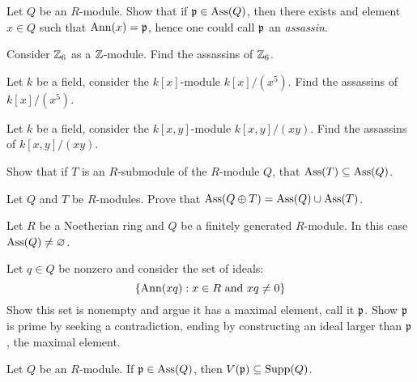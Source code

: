 \documentclass{ximera}
\begin{document}
\begin{exercise}
  Let $Q$ be an $R$-module. Show that if $\mathfrak{p}\in\operatorname{Ass}(Q)$, then there
  exists and element $x\in Q$ such that $\operatorname{Ann}(x) = \mathfrak{p}$, hence one
  could call $\mathfrak{p}$ an \textit{assassin}.
\end{exercise}

\begin{exercise}
  Consider $\mathbb Z_6$ as a $\mathbb Z$-module. Find the assassins of $\mathbb Z_6$.
\end{exercise}

\begin{exercise}
  Let $k$ be a field, consider the $k[x]$-module $k[x]/(x^5)$. Find
  the assassins of $k[x]/(x^5)$.
\end{exercise}

\begin{exercise}
  Let $k$ be a field, consider the $k[x,y]$-module $k[x,y]/(xy)$. Find
  the assassins of $k[x,y]/(xy)$.
\end{exercise}

\begin{exercise}
  Show that if $T$ is an $R$-submodule of the $R$-module $Q$, that
  $\operatorname{Ass}(T) \subseteq \operatorname{Ass}(Q)$.
\end{exercise}


\begin{exercise}
  Let $Q$ and $T$ be $R$-modules. Prove that $\operatorname{Ass}(Q\oplus T) = \operatorname{Ass}(Q)\cup\operatorname{Ass}(T)$.
\end{exercise}


\begin{proposition}
  Let $R$ be a Noetherian ring and $Q$ be a finitely generated
  $R$-module. In this case $\operatorname{Ass}(Q) \ne \varnothing$.
  \begin{sketch}
    Let $q\in Q$ be nonzero and consider the set of ideals:
    \[
    \{\operatorname{Ann}(xq): x\in R\text{ and }xq\ne 0 \}
    \]
    Show this set is nonempty and argue it has a maximal element, call
    it $\mathfrak{p}$. Show $\mathfrak{p}$ is prime by seeking a contradiction, ending by
    constructing an ideal larger than $\mathfrak{p}$, the maximal element.
  \end{sketch}
\end{proposition}


\begin{proposition}
  Let $Q$ be an $R$-module. If $\mathfrak{p}\in\operatorname{Ass}(Q)$, then $V(\mathfrak{p})\subseteq
  \operatorname{Supp}(Q)$.
  \begin{sketch}
    
  \end{sketch}
\end{proposition}
\end{document}
